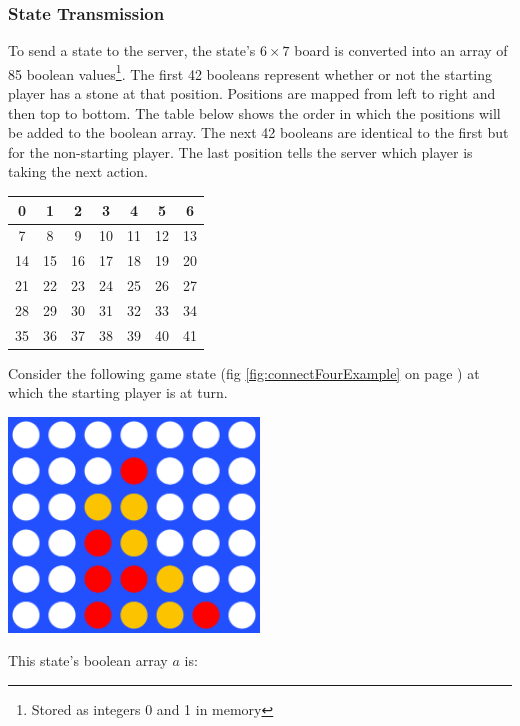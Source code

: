 \documentclass[12pt]{article}
\newcommand{\imgRef}[1]{(fig \ref{#1} on page \pageref{#1})}
\begin{document}
\subsubsection{State Transmission}
To send a state to the server, the state's \(6 \times 7\) board is converted into an array of 85 boolean values\footnote{Stored as integers 0 and 1 in memory}. The first 42 booleans represent whether or not the starting player has a stone at that position. Positions are mapped from left to right and then top to bottom. The table below shows the order in which the positions will be added to the boolean array. The next 42 booleans are identical to the first but for the non-starting player. The last position tells the server which player is taking the next action.
\begin{center}
\begin{tabular}{| c | c | c | c | c | c | c |}
 \hline
0 & 1 & 2 & 3 & 4 & 5 & 6  \\\hline
7 & 8 & 9 & 10 & 11 & 12 & 13\\\hline
14 & 15 & 16 & 17 & 18 & 19 & 20 \\\hline
21 & 22 & 23& 24 & 25 & 26 & 27 \\\hline
28 & 29 & 30 & 31 & 32 & 33 & 34 \\\hline
35 & 36 & 37 & 38 & 39 & 40 & 41 \\\hline
\end{tabular}
\end{center}
Consider the following game state \imgRef{fig:connectFourExample} at which the starting player is at turn.
\begin{center}
\includegraphics[width=0.5\textwidth]{connectFourExample}
\label{fig:connectFourExample}
\end{center}
This state's boolean array \(a\) is:
\end{document}
